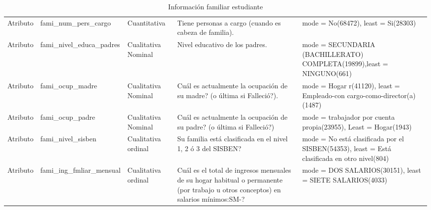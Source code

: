 \begin{table}[H]
\caption{Información familiar estudiante}
\begin{flushleft}
\begin{tabular}{|>{\centering\arraybackslash}m{2cm}|>{\arraybackslash}m{4cm}|>{\arraybackslash}m{2cm}|>{\arraybackslash}m{3cm}|>{\arraybackslash}m{4cm}| }
\hline
  \rowcolor{blue!55} 
   \multicolumn{1}{|c|}{Atributo} & \multicolumn{1}{c|}{Nombre} & \multicolumn{1}{c|}{Tipo} & 
   \multicolumn{1}{c|}{Descripción} & \multicolumn{1}{c|}{Estadística} \\ \hline
    Atributo & fami\_num\_pers\_cargo & Cuantitativa & Tiene personas a cargo (cuando es cabeza de familia). & mode = No(68472), least = Si(28303) \\ \hline
    Atributo & fami\_nivel\_educa\_padres & Cualitativa Nominal & Nivel educativo de los padres. & mode = SECUNDARIA (BACHILLERATO) COMPLETA(19899),least = NINGUNO(661) \\ \hline
    Atributo & fami\_ocup\_madre & Cualitativa Nominal & Cuál es actualmente la ocupación de su madre? (o última si Falleció?). & mode = Hogar r(41120), least = Empleado-con cargo-como-director(a)(1487) \\ \hline
    Atributo & fami\_ocup\_padre & Cualitativa Nominal & Cuál es actualmente la ocupación de su padre? (o última si Falleció?) & mode = trabajador por cuenta propia(23955), Least = Hogar(1943) \\ \hline
    Atributo & fami\_nivel\_sisben & Cualitativa ordinal & Su familia está clasificada en el nivel 1, 2 ó 3 del SISBEN? & mode = No está clasificada por el SISBEN(54353), least = Está clasificada en otro nivel(804)\\ \hline
    Atributo & fami\_ing\_fmliar\_mensual & Cualitativa ordinal & Cuál es el total de ingresos mensuales de su hogar habitual o permanente (por trabajo u otros conceptos) en salarios mínimos:SM-? & mode = DOS SALARIOS(30151), least = SIETE SALARIOS(4033) \\ \hline
    \end{tabular}
\end{flushleft}
\label{}
\end{table}

